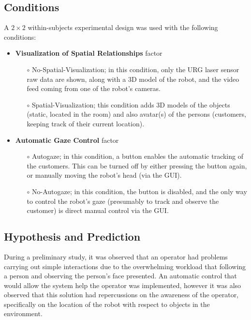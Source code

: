 \documentclass[a4paper, 10pt, conference]{ieeeconf}     %
\begin{document}
\subsection{Conditions}
A $2\times2$ within-subjects experimental design was used with the following conditions: 
\begin{itemize}
	\item {\bf Visualization of Spatial Relationships} factor
		\begin{itemize}
			\item[$\circ$] No-Spatial-Visualization; in this condition, only the URG laser sensor raw data are shown, along with a 3D model of the robot, and the video feed coming from one of the robot's cameras. 
			\item[$\circ$] Spatial-Visualization; this condition adds 3D models of the objects (static, located in the room) and also avatar(s) of the persons (customers, keeping track of their current location).
		\end{itemize}
	\item {\bf Automatic Gaze Control} factor
		\begin{itemize}
			\item[$\circ$] Autogaze; in this condition, a button enables the automatic tracking of the customers. 
			This can be turned off by either pressing the button again, or manually moving the robot's head (via the GUI).
			\item[$\circ$] No-Autogaze; in this condition, the button is disabled, and the only way to control the robot's gaze (presumably to track and observe the customer) is direct manual control via the GUI. 
	\end{itemize}
\end{itemize}

\subsection{Hypothesis and Prediction}
\label{sec:hypothesis}
During a preliminary study, it was observed that an operator had problems carrying out simple interactions due to the overwhelming workload that following a person and observing the person's face presented. 
An automatic control that would allow the system help the operator was implemented, however it was also observed that this solution had repercussions on the awareness of the operator, specifically on the location of the robot with respect to objects in the environment.
\end{document}
